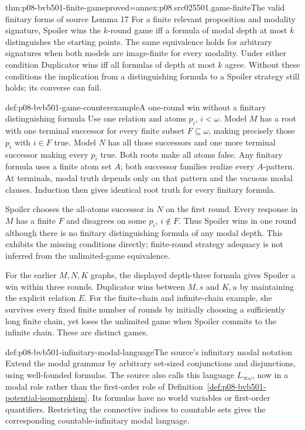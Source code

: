 \begin{hbtheorem}{thm:p08-bvb501-finite-game}{proved=annex:p08.src025501.game-finite}{The valid finitary forms of source Lemma 17}
For a finite relevant proposition and modality signature, Spoiler wins the
\(k\)-round game iff a formula of modal depth at most \(k\)
distinguishes the starting points. The same equivalence holds for arbitrary
signatures when both models are image-finite for every modality. Under
either condition Duplicator wins iff all formulas of depth at most \(k\)
agree. Without these conditions the implication from a distinguishing
formula to a Spoiler strategy still holds; its converse can fail.
\end{hbtheorem}

\begin{hbexample}{def:p08-bvb501-game-counterexample}{A one-round win without a finitary distinguishing formula}
Use one relation and atoms \(p_i\), \(i<\omega\). Model \(M\)
has a root with one terminal successor for every finite subset
\(F\subseteq\omega\), making precisely those \(p_i\) with
\(i\in F\) true. Model \(N\) has all those successors and one more
terminal successor making every \(p_i\) true. Both roots make all atoms
false. Any finitary formula uses a finite atom set \(A\); both successor
families realize every \(A\)-pattern. At terminals, modal truth depends
only on that pattern and the vacuous modal clauses. Induction then gives
identical root truth for every finitary formula.

Spoiler chooses the all-atoms successor in \(N\) on the first round.
Every response in \(M\) has a finite \(F\) and disagrees on some
\(p_i\), \(i\notin F\). Thus Spoiler wins in one round although
there is no finitary distinguishing formula of any modal depth. This
exhibits the missing conditions directly; finite-round strategy adequacy
is not inferred from the unlimited-game equivalence.
\end{hbexample}

For the earlier \(M,N,K\) graphs, the displayed depth-three formula gives
Spoiler a win within three rounds. Duplicator wins between \(M,s\) and
\(K,u\) by maintaining the explicit relation \(E\). For the finite-chain
and infinite-chain example, she survives every fixed finite number of rounds
by initially choosing a sufficiently long finite chain, yet loses the unlimited
game when Spoiler commits to the infinite chain. These are distinct games.

\begin{hbdefinition}{def:p08-bvb501-infinitary-modal-language}{The source's infinitary modal notation}
Extend the modal grammar by arbitrary set-sized conjunctions and disjunctions,
using well-founded formulas. The source also calls this language
\(L_{\infty\omega}\), now in a modal role rather than the first-order
role of Definition~\ref{def:p08-bvb501-potential-isomorphism}.
Its formulas have no world variables or first-order quantifiers.
Restricting the connective indices to countable sets gives the corresponding
countable-infinitary modal language.
\end{hbdefinition}

